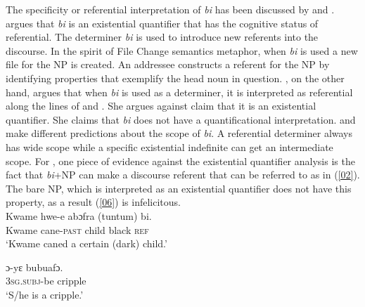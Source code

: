 \documentclass[output=paper,modfonts,nonflat,draftmode]{langsci/langscibook}
\begin{document}
The specificity or referential interpretation of \emph{bi} has been discussed by \citet{Amfo2009} and \citet{Arkoh2011}. \citet{Amfo2009} argues that \emph{bi} is an existential quantifier that has the cognitive status of referential. The determiner \emph{bi} is used to introduce new referents into the discourse. In the spirit of  File Change semantics metaphor, when \emph{bi} is used a new file for the NP is created. An addressee constructs a referent for the NP by identifying properties that exemplify the head noun in question. \citet{Arkoh2011}, on the other hand, argues that when \emph{bi} is used as a determiner, it is interpreted as referential along the lines of \citet{FodorSag1982} and \citet{Kratzer1998}. She argues against  claim that it is an existential quantifier. She claims that \emph{bi} does not have a quantificational interpretation. \citet{Amfo2009} and \citet{Arkoh2011} make different predictions about the scope of \emph{bi}. A referential determiner always has wide scope while a specific existential indefinite can get an intermediate scope. For \citet{Arkoh2011}, one piece of evidence against the existential quantifier analysis is the fact that \emph{bi}+NP can make a discourse referent that can be referred to as in (\ref{02}). The bare NP, which is interpreted as an existential quantifier does not have this property, as a result (\ref{06}) is infelicitous.    
\ea
{}\\
\ea\label{01} 
\gll Kwame  hwe-e  abɔfra (tuntum) bi.\\
 Kwame cane-\textsc{past} child black \textsc{ref}\\
 
\glt ‘Kwame caned a certain (dark) child.'

\ex\label{02}
\gll ɔ-yε bubuafɔ.\\
\textsc{3sg.subj}-be cripple\\
 
\glt ‘S/he is a cripple.’
\z \z

\ea
{}\\

\z \z 
\end{document}
